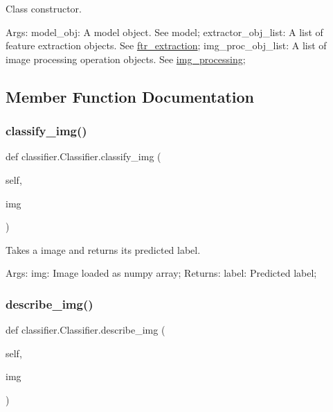 Class constructor. 

Args\+: model\+\_\+obj\+: A model object. See model; extractor\+\_\+obj\+\_\+list\+: A list of feature extraction objects. See \mbox{\hyperlink{namespaceftr__extraction}{ftr\+\_\+extraction}}; img\+\_\+proc\+\_\+obj\+\_\+list\+: A list of image processing operation objects. See \mbox{\hyperlink{namespaceimg__processing}{img\+\_\+processing}}; 

\subsection{Member Function Documentation}
\mbox{\label{classclassifier_1_1_classifier_ab5738cbcf0446b4b0432022e456f940e}} 
\subsubsection{\texorpdfstring{classify\+\_\+img()}{classify\_img()}}
{\footnotesize\ttfamily def classifier.\+Classifier.\+classify\+\_\+img (\begin{DoxyParamCaption}\item[{}]{self,  }\item[{}]{img }\end{DoxyParamCaption})}



Takes a image and returns it\textquotesingle{}s predicted label. 

Args\+: img\+: Image loaded as numpy array; Returns\+: label\+: Predicted label; \mbox{\label{classclassifier_1_1_classifier_af8f6cb74f105de67966fed3bece2c77b}} 
\subsubsection{\texorpdfstring{describe\+\_\+img()}{describe\_img()}}
{\footnotesize\ttfamily def classifier.\+Classifier.\+describe\+\_\+img (\begin{DoxyParamCaption}\item[{}]{self,  }\item[{}]{img }\end{DoxyParamCaption})}



